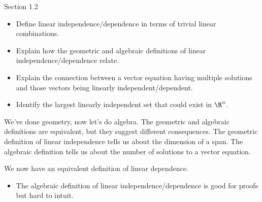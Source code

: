 \begin{lesson}

	Section 1.2

	\begin{itemize}
		\item Define linear independence/dependence in terms of trivial linear combinations.
		\item Explain how the geometric and algebraic definitions of linear independence/dependence relate.
		\item Explain the connection between a vector equation having multiple
			solutions and those vectors being linearly independent/dependent.
		\item Identify the largest linearly independent set that could exist in $\R^n$.
	\end{itemize}

	We've done geometry, now let's do algebra. The geometric and algebraic definitions
	are equivalent, but they suggest different consequences. The geometric definition
	of linear independence tells us about the dimension of a span. The algebraic
	definition tells us about the number of solutions to a vector equation.

\end{lesson}

	We now have an equivalent definition of linear dependence.
	\begin{annotation}
		\begin{notes}
			\begin{itemize}
				\item The algebraic definition of linear independence/dependence
					is good for proofs but hard to intuit.
			\end{itemize}
		\end{notes}
	\end{annotation}

	\bookonlynewpage

